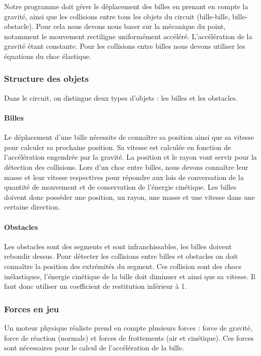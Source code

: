 \documentclass{report}
\begin{document}
Notre programme doit gérer le déplacement des billes en prenant en compte la gravité, ainsi que les collisions entre tous les objets du circuit (bille-bille, bille-obstacle). Pour cela nous devons nous baser sur la mécanique du point, notamment le mouvement rectiligne uniformément accéléré. L’accélération de la gravité étant constante. Pour les collisions entre billes nous devons utiliser les équations du choc élastique. 


\subsubsection{Structure des objets}

Dans le circuit, on distingue deux types d’objets : les billes et les obstacles.


\paragraph{Billes}

Le déplacement d’une bille nécessite de connaître sa  position ainsi que sa  vitesse pour calculer sa prochaine position. Sa vitesse est calculée en fonction de l’accélération engendrée par la gravité. La position et le rayon vont servir pour la détection des collisions. Lors d’un choc entre billes, nous devons connaître leur masse et leur vitesse respectives pour répondre aux lois de conversation de la quantité de mouvement et de conservation de l’énergie cinétique. Les billes doivent donc posséder une position, un rayon, une masse et une vitesse dans une certaine direction. 


\paragraph{Obstacles}

Les obstacles sont des segments et sont infranchissables, les billes doivent rebondir dessus. Pour détecter les collisions entre billes et obstacles on doit connaître la position des extrémités du segment. Ces collision sont des chocs inélastiques, l’énergie cinétique de la bille doit diminuer et ainsi que sa vitesse. Il faut donc utiliser un coefficient de restitution inférieur à 1.

\subsubsection{Forces en jeu}

Un moteur physique réaliste prend en compte plusieurs forces : force de gravité, force de réaction (normale) et forces de frottements (air et cinétique). Ces forces sont nécessaires pour le calcul de l’accélération de la bille.
\end{document}
